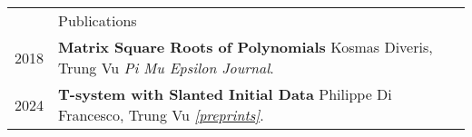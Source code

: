 \documentclass[letterpaper, 11pt]{article}
\newcommand{\headingfont}{\Large\color{Red}}
\newenvironment{SectionTable}[1]{
	\renewcommand*{\arraystretch}{1.7}
	\setlength{\tabcolsep}{10pt}
	\begin{longtable}{Rp{5.2in}} & #1 \\}
	{\end{longtable}\vspace{-.3cm}}
\begin{document}
	
	\begin{SectionTable}{\headingfont Publications} 
		2018 & 
		\textbf{Matrix Square Roots of Polynomials} \newline
		Kosmas Diveris, Trung Vu \newline
		\textit{Pi Mu Epsilon Journal}. \\

		2024 & 
		\textbf{T-system with Slanted Initial Data} \newline
		Philippe Di Francesco, Trung Vu \newline
		\textit{\href{https://arxiv.org/abs/2403.02479}{[preprints]}}. \\
		
		
		
	\end{SectionTable}
	
\end{document}
